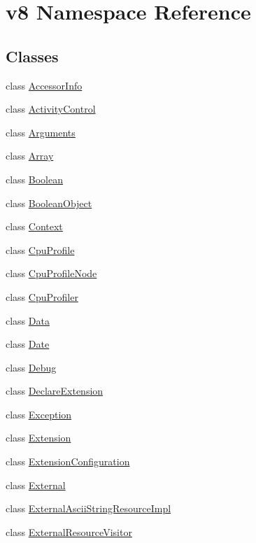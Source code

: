 \hypertarget{namespacev8}{}\section{v8 Namespace Reference}
\label{namespacev8}
\subsection*{Classes}
\begin{DoxyCompactItemize}
\item 
class \hyperlink{classv8_1_1_accessor_info}{Accessor\+Info}
\item 
class \hyperlink{classv8_1_1_activity_control}{Activity\+Control}
\item 
class \hyperlink{classv8_1_1_arguments}{Arguments}
\item 
class \hyperlink{classv8_1_1_array}{Array}
\item 
class \hyperlink{classv8_1_1_boolean}{Boolean}
\item 
class \hyperlink{classv8_1_1_boolean_object}{Boolean\+Object}
\item 
class \hyperlink{classv8_1_1_context}{Context}
\item 
class \hyperlink{classv8_1_1_cpu_profile}{Cpu\+Profile}
\item 
class \hyperlink{classv8_1_1_cpu_profile_node}{Cpu\+Profile\+Node}
\item 
class \hyperlink{classv8_1_1_cpu_profiler}{Cpu\+Profiler}
\item 
class \hyperlink{classv8_1_1_data}{Data}
\item 
class \hyperlink{classv8_1_1_date}{Date}
\item 
class \hyperlink{classv8_1_1_debug}{Debug}
\item 
class \hyperlink{classv8_1_1_declare_extension}{Declare\+Extension}
\item 
class \hyperlink{classv8_1_1_exception}{Exception}
\item 
class \hyperlink{classv8_1_1_extension}{Extension}
\item 
class \hyperlink{classv8_1_1_extension_configuration}{Extension\+Configuration}
\item 
class \hyperlink{classv8_1_1_external}{External}
\item 
class \hyperlink{classv8_1_1_external_ascii_string_resource_impl}{External\+Ascii\+String\+Resource\+Impl}
\item 
class \hyperlink{classv8_1_1_external_resource_visitor}{External\+Resource\+Visitor}

\end{DoxyCompactItemize}
